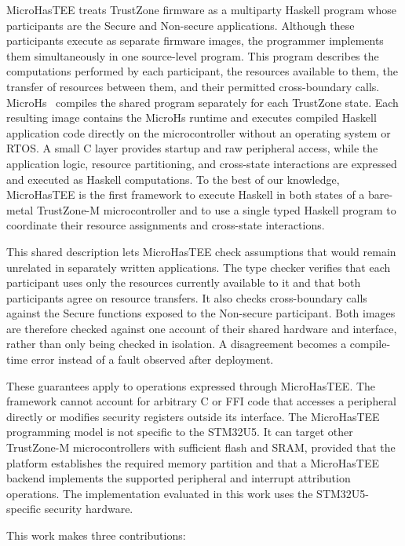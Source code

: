 \documentclass[sigconf]{acmart}
\begin{document}
MicroHasTEE treats TrustZone firmware as a multiparty Haskell program whose participants are the Secure and Non-secure applications.
Although these participants execute as separate firmware images, the programmer implements them simultaneously in one source-level program.
This program describes the computations performed by each participant, the resources available to them, the transfer of resources between them, and their permitted cross-boundary calls.
MicroHs~\cite{augustsson2024microhs} compiles the shared program separately for each TrustZone state.
Each resulting image contains the MicroHs runtime and executes compiled Haskell application code directly on the microcontroller without an operating system or RTOS.
A small C layer provides startup and raw peripheral access, while the application logic, resource partitioning, and cross-state interactions are expressed and executed as Haskell computations.
To the best of our knowledge, MicroHasTEE is the first framework to execute Haskell in both states of a bare-metal TrustZone-M microcontroller and to use a single typed Haskell program to coordinate their resource assignments and cross-state interactions.

This shared description lets MicroHasTEE check assumptions that would remain unrelated in separately written applications.
The type checker verifies that each participant uses only the resources currently available to it and that both participants agree on resource transfers.
It also checks cross-boundary calls against the Secure functions exposed to the Non-secure participant.
Both images are therefore checked against one account of their shared hardware and interface, rather than only being checked in isolation.
A disagreement becomes a compile-time error instead of a fault observed after deployment.

These guarantees apply to operations expressed through MicroHasTEE.
The framework cannot account for arbitrary C or FFI code that accesses a peripheral directly or modifies security registers outside its interface.
The MicroHasTEE programming model is not specific to the STM32U5.
It can target other TrustZone-M microcontrollers with sufficient flash and SRAM, provided that the platform establishes the required memory partition and that a MicroHasTEE backend implements the supported peripheral and interrupt attribution operations.
The implementation evaluated in this work uses the STM32U5-specific security hardware.

This work makes three contributions:
\end{document}
